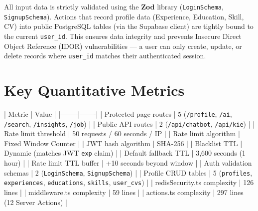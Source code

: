 All input data is strictly validated using the \textbf{Zod} library (\texttt{LoginSchema}, \texttt{SignupSchema}). Actions that record profile data (Experience, Education, Skill, CV) into public PostgreSQL tables (via the Supabase client) are tightly bound to the current \texttt{user\_id}. This ensures data integrity and prevents Insecure Direct Object Reference (IDOR) vulnerabilities — a user can only create, update, or delete records where \texttt{user\_id} matches their authenticated session.

\section{Key Quantitative Metrics}

| Metric | Value |
|--------|-------|
| Protected page routes | 5 (\texttt{/profile}, \texttt{/ai}, \texttt{/search}, \texttt{/insights}, \texttt{/job}) |
| Public API routes | 2 (\texttt{/api/chatbot}, \texttt{/api/kie}) |
| Rate limit threshold | 50 requests / 60 seconds / IP |
| Rate limit algorithm | Fixed Window Counter |
| JWT hash algorithm | SHA-256 |
| Blacklist TTL | Dynamic (matches JWT \texttt{exp} claim) |
| Default fallback TTL | 3,600 seconds (1 hour) |
| Rate limit TTL buffer | +10 seconds beyond window |
| Auth validation schemas | 2 (\texttt{LoginSchema}, \texttt{SignupSchema}) |
| Profile CRUD tables | 5 (\texttt{profiles}, \texttt{experiences}, \texttt{educations}, \texttt{skills}, \texttt{user\_cvs}) |
| redisSecurity.ts complexity | 126 lines |
| middleware.ts complexity | 59 lines |
| actions.ts complexity | 297 lines (12 Server Actions) |
